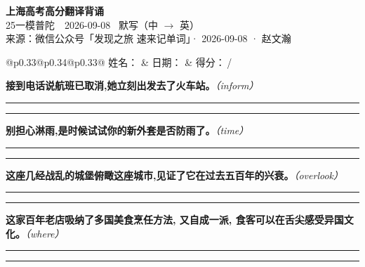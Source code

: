 \documentclass[11pt,a4paper]{article}
\newcommand{\num}[1]{\makebox[1.9em][r]{#1.}\hspace{0.3em}}
\newcommand{\wline}{\noindent\rule{\linewidth}{0.4pt}}
\newcommand{\prompt}[1]{\emph{\textcolor{tipblue}{\small（#1）}}}
\begin{document}
\pagestyle{plain}
\begin{center}
{\LARGE\bfseries 上海高考高分翻译背诵 }\\[0.25em]
{\large 25一模普陀　2026-09-08 \quad\ 默写（中 $\to$ 英）}\\[0.35em]
{\footnotesize 来源：微信公众号「发现之旅 速来记单词」· 2026-09-08 · 赵文瀚}
\end{center}

\vspace{0.4em}
\noindent\begin{tabular}{@{}p{0.33\textwidth}@{}p{0.34\textwidth}@{}p{0.33\textwidth}@{}}
姓名：\underline{\hspace{2.0cm}} & 日期：\underline{\hspace{2.0cm}} & 得分：\underline{\hspace{1.4cm}}\,/ \\
\end{tabular}

\vspace{0.5em}

\vspace{0.8em}
\num{1}\textbf{接到电话说航班已取消,她立刻出发去了火车站。}\prompt{inform}

\vspace{0.3em}

\wline\vspace{0.3em}
\wline

\num{2}\textbf{别担心淋雨,是时候试试你的新外套是否防雨了。}\prompt{time}

\vspace{0.3em}

\wline\vspace{0.3em}
\wline

\num{3}\textbf{这座几经战乱的城堡俯瞰这座城市,见证了它在过去五百年的兴衰。}\prompt{overlook}

\vspace{0.3em}

\wline\vspace{0.3em}
\wline

\num{4}\textbf{这家百年老店吸纳了多国美食烹任方法, 又自成一派, 食客可以在舌尖感受异国文化。}\prompt{where}

\vspace{0.3em}

\wline\vspace{0.3em}
\wline
\end{document}

